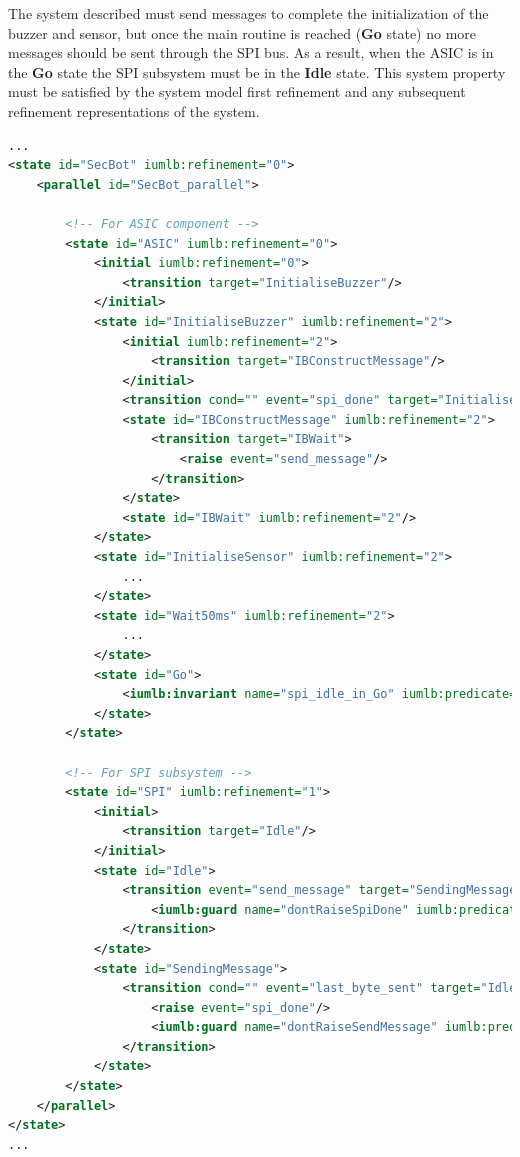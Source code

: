 The system described must send messages to complete the initialization of the buzzer and sensor, but once the main routine is reached (\textbf{Go} state) no more messages should be sent through the SPI bus. As a result, when the ASIC is in the \textbf{Go} state the SPI subsystem must be in the \textbf{Idle} state. This system property must be satisfied by the system model first refinement and any subsequent refinement representations of the system.

\begin{lstlisting}[caption=Snippet for SCXML representation of SecBot model,label={lst:secBot}, language=xml]
...
<state id="SecBot" iumlb:refinement="0">
    <parallel id="SecBot_parallel">

     	<!-- For ASIC component -->
    	<state id="ASIC" iumlb:refinement="0">
        	<initial iumlb:refinement="0">
          		<transition target="InitialiseBuzzer"/>
        	</initial>
        	<state id="InitialiseBuzzer" iumlb:refinement="2">
        		<initial iumlb:refinement="2">
	            	<transition target="IBConstructMessage"/>
	          	</initial>
          		<transition cond="" event="spi_done" target="InitialiseSensor"/>
          		<state id="IBConstructMessage" iumlb:refinement="2">
	            	<transition target="IBWait">
	              		<raise event="send_message"/>
	            	</transition>
          		</state>
          		<state id="IBWait" iumlb:refinement="2"/>
        	</state>
       		<state id="InitialiseSensor" iumlb:refinement="2">
        		...
        	</state>
        	<state id="Wait50ms" iumlb:refinement="2">
          		...
        	</state>
        	<state id="Go">
          		<iumlb:invariant name="spi_idle_in_Go" iumlb:predicate="Idle = TRUE" iumlb:refinement="1"/>
        	</state>
      	</state>

      	<!-- For SPI subsystem -->
      	<state id="SPI" iumlb:refinement="1">
	        <initial>
	        	<transition target="Idle"/>
	        </initial>
	        <state id="Idle">
				<transition event="send_message" target="SendingMessage">
					<iumlb:guard name="dontRaiseSpiDone" iumlb:predicate="spi_done ∉ SCXML_raisedTriggers" iumlb:refinement="1"/>
				</transition>
        	</state>
			<state id="SendingMessage">
				<transition cond="" event="last_byte_sent" target="Idle">
					<raise event="spi_done"/>
					<iumlb:guard name="dontRaiseSendMessage" iumlb:predicate="send_message ∉ SCXML_raisedTriggers" iumlb:refinement="1"/>
				</transition>
			</state>
		</state>
	</parallel>
</state>
...
\end{lstlisting}




